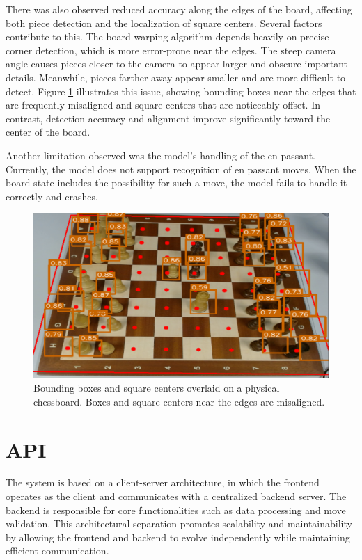 There was also observed reduced accuracy along the edges of the board, affecting both piece detection and the localization of square centers. Several factors contribute to this. The board-warping algorithm depends heavily on precise corner detection, which is more error-prone near the edges. The steep camera angle causes pieces closer to the camera to appear larger and obscure important details. Meanwhile, pieces farther away appear smaller and are more difficult to detect. Figure \ref{fig:bbox-centers-incorrect} illustrates this issue, showing bounding boxes near the edges that are frequently misaligned and square centers that are noticeably offset. In contrast, detection accuracy and alignment improve significantly toward the center of the board.

Another limitation observed was the model's handling of the en passant. Currently, the model does not support recognition of en passant moves. When the board state includes the possibility for such a move, the model fails to handle it correctly and crashes.


\begin{figure}[h!]
    \centering
    \includegraphics[width=0.75\linewidth]{figures/discussion/bbox-centers-incorrect.png}
    \caption[Bounding box and square center misalignment]{Bounding boxes and square centers overlaid on a physical chessboard. Boxes and square centers near the edges are misaligned.}
    \label{fig:bbox-centers-incorrect}
\end{figure}


\section{API}
The system is based on a client-server architecture, in which the frontend operates as the client and communicates with a centralized backend server. The backend is responsible for core functionalities such as data processing and move validation. This architectural separation promotes scalability and maintainability by allowing the frontend and backend to evolve independently while maintaining efficient communication. \\


